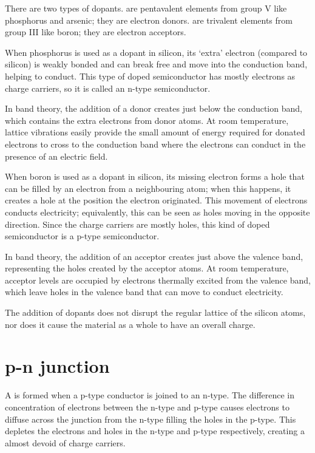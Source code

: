 \documentclass[Physics.tex]{subfiles}
\begin{document}
There are two types of dopants.  are pentavalent elements from group V like phosphorus and arsenic; they are electron donors.  are trivalent elements from group III like boron; they are electron acceptors.

When phosphorus is used as a dopant in silicon, its `extra' electron (compared to silicon) is weakly bonded and can break free and move into the conduction band, helping to conduct. This type of doped semiconductor has mostly electrons as charge carriers, so it is called an n-type semiconductor.

In band theory, the addition of a donor creates  just below the conduction band, which contains the extra electrons from donor atoms. At room temperature, lattice vibrations easily provide the small amount of energy required for donated electrons to cross to the conduction band where the electrons can conduct in the presence of an electric field.

When boron is used as a dopant in silicon, its missing electron forms a hole that can be filled by an electron from a neighbouring atom; when this happens, it creates a hole at the position the electron originated. This movement of electrons conducts electricity; equivalently, this can be seen as holes moving in the opposite direction. Since the charge carriers are mostly holes, this kind of doped semiconductor is a p-type semiconductor. 

In band theory, the addition of an acceptor creates  just above the valence band, representing the holes created by the acceptor atoms. At room temperature, acceptor levels are occupied by electrons thermally excited from the valence band, which leave holes in the valence band that can move to conduct electricity.

The addition of dopants does not disrupt the regular lattice of the silicon atoms, nor does it cause the material as a whole to have an overall charge.
\section{p-n junction}
A  is formed when a p-type conductor is joined to an n-type. The difference in concentration of electrons between the n-type and p-type causes electrons to diffuse across the junction from the n-type filling the holes in the p-type. This depletes the electrons and holes in the n-type and p-type respectively, creating a  almost devoid of charge carriers.
\end{document}
